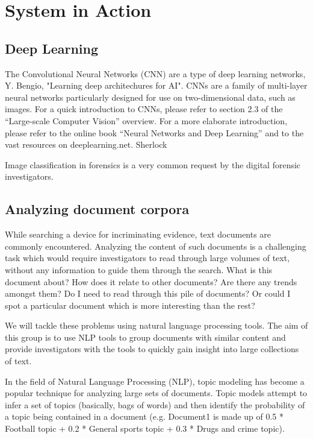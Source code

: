 \section{System in Action}
\label{system_in_action}


\subsection{Deep Learning}
The Convolutional Neural Networks (CNN) are a type of deep learning networks, Y. Bengio, "Learning deep
architechures for AI". CNNs are a family of multi-layer neural networks particularly designed for use
on two-dimensional data, such as images. For a quick introduction to CNNs, please refer to section 2.3
of the “Large-scale Computer Vision” overview. For a more elaborate introduction, please refer to the
online book “Neural Networks and Deep Learning” and to the vast resources on deeplearning.net.
Sherlock

Image classification in forensics is a very common request by the digital forensic investigators. 

\subsection{Analyzing document corpora}
While searching a device for incriminating evidence, text documents are commonly encountered. Analyzing the
content of such documents is a challenging task which would require investigators to read through large volumes
of text, without any information to guide them through the search. What is this document about? How does it
relate to other documents? Are there any trends amongst them? Do I need to read through this pile of documents?
Or could I spot a particular document which is more interesting than the rest?

We will tackle these problems using natural language processing tools. The aim of this group is to use NLP
tools to group documents with similar content and provide investigators with the tools to quickly gain insight
into large collections of text.

In the field of Natural Language Processing (NLP), topic modeling has become a popular technique for analyzing
large sets of documents. Topic models attempt to infer a set of topics (basically, bags of words) and then
identify the probability of a topic being contained in a document (e.g. Document1 is made up of 0.5 * Football
topic + 0.2 * General sports topic + 0.3 * Drugs and crime topic).

